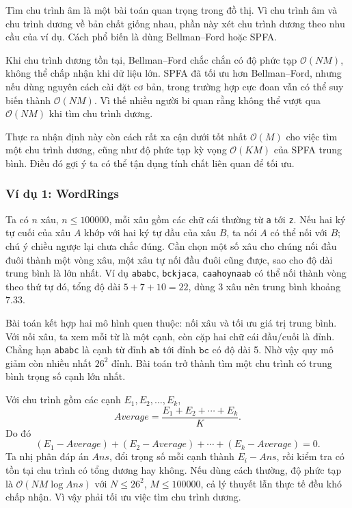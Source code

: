 \documentclass[11pt]{article}
\newcommand{\Oh}{\mathcal{O}}
\begin{document}
Tìm chu trình âm là một bài toán quan trọng trong đồ thị. Vì chu trình âm và
chu trình dương về bản chất giống nhau, phần này xét chu trình dương theo nhu
cầu của ví dụ. Cách phổ biến là dùng Bellman--Ford hoặc SPFA.

Khi chu trình dương tồn tại, Bellman--Ford chắc chắn có độ phức tạp
\(\Oh(NM)\), không thể chấp nhận khi dữ liệu lớn. SPFA đã tối ưu hơn
Bellman--Ford, nhưng nếu dùng nguyên cách cài đặt cơ bản, trong trường hợp cực
đoan vẫn có thể suy biến thành \(\Oh(NM)\). Vì thế nhiều người bi quan rằng
không thể vượt qua \(\Oh(NM)\) khi tìm chu trình dương.

Thực ra nhận định này còn cách rất xa cận dưới tốt nhất \(\Oh(M)\) cho việc
tìm một chu trình dương, cũng như độ phức tạp kỳ vọng \(\Oh(KM)\) của SPFA
trung bình. Điều đó gợi ý ta có thể tận dụng tính chất liên quan để tối ưu.

\subsubsection*{Ví dụ 1: WordRings}

Ta có \(n\) xâu, \(n\le 100000\), mỗi xâu gồm các chữ cái thường từ
\texttt{a} tới \texttt{z}. Nếu hai ký tự cuối của xâu \(A\) khớp với hai ký
tự đầu của xâu \(B\), ta nói \(A\) có thể nối với \(B\); chú ý chiều ngược
lại chưa chắc đúng. Cần chọn một số xâu cho chúng nối đầu đuôi thành một vòng
xâu, một xâu tự nối đầu đuôi cũng được, sao cho độ dài trung bình là lớn
nhất. Ví dụ \texttt{ababc}, \texttt{bckjaca}, \texttt{caahoynaab} có thể nối
thành vòng theo thứ tự đó, tổng độ dài \(5+7+10=22\), dùng 3 xâu nên trung
bình khoảng \(7.33\).

Bài toán kết hợp hai mô hình quen thuộc: nối xâu và tối ưu giá trị trung bình.
Với nối xâu, ta xem mỗi từ là một cạnh, còn cặp hai chữ cái đầu/cuối là đỉnh.
Chẳng hạn \texttt{ababc} là cạnh từ đỉnh \(\texttt{ab}\) tới đỉnh
\(\texttt{bc}\) có độ dài 5. Nhờ vậy quy mô giảm còn nhiều nhất \(26^2\)
đỉnh. Bài toán trở thành tìm một chu trình có trung bình trọng số cạnh lớn
nhất.

Với chu trình gồm các cạnh \(E_1,E_2,\ldots,E_k\),
\[
  \mathit{Average}=\frac{E_1+E_2+\cdots+E_k}{K}.
\]
Do đó
\[
  (E_1-\mathit{Average})+(E_2-\mathit{Average})+\cdots+
  (E_k-\mathit{Average})=0.
\]
Ta nhị phân đáp án \(\mathit{Ans}\), đổi trọng số mỗi cạnh thành
\(E_i-\mathit{Ans}\), rồi kiểm tra có tồn tại chu trình có tổng dương hay
không. Nếu dùng cách thường, độ phức tạp là \(\Oh(NM\log \mathit{Ans})\) với
\(N\le 26^2\), \(M\le 100000\), cả lý thuyết lẫn thực tế đều khó chấp nhận.
Vì vậy phải tối ưu việc tìm chu trình dương.
\end{document}
